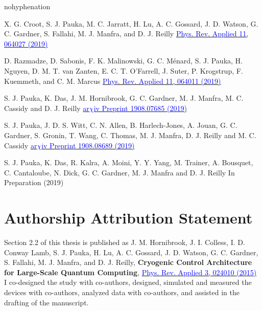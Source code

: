 \begin{hyphenrules}{nohyphenation}
\begin{sloppypar}
      {X. G. Croot, S. J. Pauka, M. C. Jarratt, H. Lu, A. C. Gossard, J. D. Watson, G. C. Gardner, S. Fallahi, M. J. Manfra, and D. J. Reilly}
      {\href{https://doi.org/\detokenize{10.1103/PhysRevApplied.11.064027}}{\textcolor{blue}{Phys. Rev. Applied 11, 064027 (2019)}}}

      {D. Razmadze, D. Sabonis, F. K. Malinowski, G. C. Ménard, S. J. Pauka, H. Nguyen, D. M. T. van Zanten, E. C. T. O'Farrell, J. Suter, P. Krogstrup, F. Kuemmeth, and C. M. Marcus}
      {\href{https://doi.org/\detokenize{10.1103/PhysRevApplied.11.064011}}{\textcolor{blue}{Phys. Rev. Applied 11, 064011 (2019)}}}

      {S. J. Pauka, K. Das, J. M. Hornibrook, G. C. Gardner, M. J. Manfra, M. C. Cassidy and D. J. Reilly}
      {\href{https://arxiv.org/abs/1908.07685}{\textcolor{blue}{ar$χ$iv Preprint 1908.07685 (2019)}}}

      {S. J. Pauka, J. D. S. Witt, C. N. Allen, B. Harlech-Jones, A. Jouan, G. C. Gardner, S. Gronin, T. Wang, C. Thomas, M. J. Manfra, D. J. Reilly and M. C. Cassidy}
      {\href{https://arxiv.org/abs/1908.08689}{\textcolor{blue}{ar$χ$iv Preprint 1908.08689 (2019)}}}

      {S. J. Pauka, K. Das, R. Kalra, A. Moini, Y. Y. Yang, M. Trainer, A. Bousquet, C. Cantaloube, N. Dick, G. C. Gardner, M. J. Manfra and D. J. Reilly}
      {In Preparation (2019)}

      \newpage

      \chapter*{Authorship Attribution Statement}
      \setlength{\parskip}{1.5em}

      \vspace{-2em}
      \noindent
      Section 2.2 of this thesis is published as J. M. Hornibrook, J. I. Colless, I. D. Conway Lamb, S. J. Pauka, H. Lu, A. C. Gossard, J. D. Watson, G. C. Gardner, S. Fallahi, M. J. Manfra, and D. J. Reilly,
      \textbf{Cryogenic Control Architecture for Large-Scale Quantum Computing},
      \href{https://doi.org/\detokenize{10.1103/PhysRevApplied.3.024010}}{\textcolor{blue}{Phys. Rev. Applied 3, 024010 (2015)}} \\
      I co-designed the study with co-authors, designed, simulated and measured the devices with co-authors, analyzed data with co-authors, and assisted in the drafting of the manuscript.


\end{sloppypar}
\end{hyphenrules}
